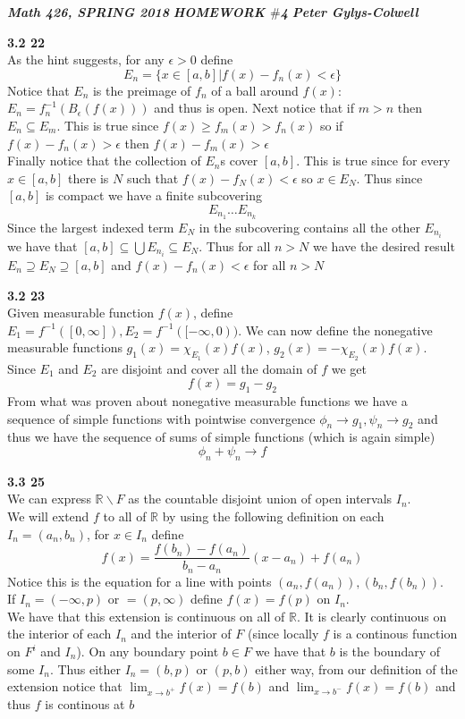 \documentclass[12pt]{article}
\newenvironment{ques}[1]{\textbf{#1}\vspace{1 mm}\\ }{\bigskip}
\theoremstyle{definition}
\newcommand{\R}{\mathbb R}
\renewcommand{\-}{\backslash}
\begin{document}
\noindent \textit{\textbf{Math 426, SPRING 2018}} \hspace{1.3cm}
\textit{\textbf{HOMEWORK $\#$4}} \hspace{1.3cm} \textit{\textbf{Peter
Gylys-Colwell}} 

\vspace{1cm}
\begin{ques}{3.2 22}
	As the hint suggests, for any $\epsilon > 0$ define 
	$$E_n = \{x \in [a,b] | f(x)- f_n(x) < \epsilon \}$$
	Notice that $E_n$ is the preimage of $f_n$ of a ball around $f(x)$: $E_n =
	f_n^{-1}(B_\epsilon(f(x)))$ and thus is open. Next notice that if $m > n$
	then $E_n \subseteq E_m$. This is true since $f(x) \geq f_m(x) > f_n(x)$ so
	if $f(x) - f_n(x) > \epsilon$ then $f(x) - f_m(x) > \epsilon$\\
	Finally notice that the collection of $E_n$s cover $[a,b]$. This is true
	since for every $x \in [a,b]$ there is $N$ such that $f(x) - f_N(x) <
	\epsilon$ so $x \in E_N$. Thus since $[a,b]$ is compact we have a finite
	subcovering 
	$$E_{n_1} \dots E_{n_k}$$
	Since the largest indexed term $E_N$ in the subcovering contains all the other
	$E_{n_i}$ we have that $[a,b] \subseteq \bigcup E_{n_i} \subseteq E_N$.
	Thus for all $n > N$ we have the desired result $E_n \supseteq E_N
	\supseteq [a,b]$ and $f(x) - f_n(x) < \epsilon$ for all $n > N$
\end{ques}

\begin{ques}{3.2 23}
	Given measurable function $f(x)$, define $E_1 = f^{-1}([0,\infty]), E_2 =
	f^{-1}([-\infty, 0))$. We can now define the nonegative measurable
	functions $g_1(x) = \chi_{E_1}(x)f(x)$, $g_2(x) = -\chi_{E_2}(x)f(x)$.
	Since $E_1$ and $E_2$ are disjoint and cover all the domain of $f$ we get
	$$f(x) = g_1 - g_2$$
	From what was proven about nonegative measurable functions we have a
	sequence of simple functions with pointwise convergence $\phi_n \to g_1,
	\psi_n \to g_2$ and thus we have the sequence of sums of simple functions (which is
	again simple)
	$$\phi_n + \psi_n \to f$$
\end{ques}

\begin{ques}{3.3 25}
	We can express $\R \backslash F$ as the countable disjoint union of open
	intervals $I_n$.\\
	We will extend $f$ to all of $\R$ by using the following definition on each
	$I_n = (a_n,b_n)$, for $x \in I_n$ define 
	$$f(x) = \frac{f(b_n) - f(a_n)}{b_n-a_n}(x - a_n) + f(a_n)$$
	Notice this is the equation for a line with points $(a_n,f(a_n)), (b_n, f(b_n))$.\\
	If $I_n = (-\infty, p)$ or $= (p, \infty)$ define $f(x) = f(p)$ on $I_n$.\\
	We have that this extension is continuous on all of $\R$. It is clearly
	continuous on the interior of each $I_n$ and the interior of $F$ (since
	locally $f$ is a continous function on $F^i$ and $I_n$). On any boundary
	point $b \in F$ we have that $b$ is the boundary of some $I_n$. Thus either
	$I_n = (b, p)$ or $(p,b)$ either way, from our definition of the extension
	notice that $\lim_{x \to b^+}f(x) = f(b)$ and $\lim_{x \to b^-} f(x) =
	f(b)$ and thus $f$ is continous at $b$
\end{ques}
\end{document}
